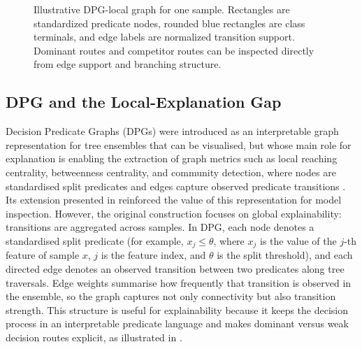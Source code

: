 \documentclass[runningheads]{llncs}
\begin{document}
\begin{figure}[t]
\centering
{}
\caption{Illustrative DPG-local graph for one sample. Rectangles are
standardized predicate nodes, rounded blue rectangles are class terminals, and edge labels are
normalized transition support. Dominant routes and competitor routes can be
inspected directly from edge support and branching structure.}
\label{fig:dpg-example}
\end{figure}

\subsection{DPG and the Local-Explanation Gap}
Decision Predicate Graphs (DPGs) were introduced as an interpretable graph representation for tree ensembles that can be visualised, but whose main role for explanation is enabling the extraction of graph metrics such as local reaching centrality, betweenness centrality, and community detection, where nodes are standardised split predicates and edges capture observed predicate transitions \cite{arrighi2024decision}. 
Its extension presented in \cite{ceschin2025extending} reinforced the value of this representation for model inspection. However, the original construction focuses on global explainability: transitions are aggregated across samples.
In DPG, each node denotes a standardised split predicate (for example, $x_j \le \theta$, where $x_j$ is the value of the $j$-th feature of sample $x$, $j$ is the feature index, and $\theta$ is the split threshold), and each directed edge denotes an observed transition between two predicates along tree traversals. Edge weights summarise how frequently that transition is observed in the ensemble, so the graph captures not only connectivity but also transition strength. This structure is useful for explainability because it keeps the decision process in an interpretable predicate language and makes dominant versus weak decision routes explicit, as illustrated in .
\end{document}
